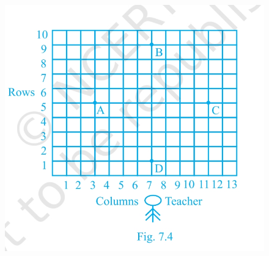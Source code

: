 \documentclass[12pt]{article}
\begin{document}
\begin{enumerate}
\begin{figure}[h!]
  \centering
  \includegraphics[width=\columnwidth]{figs/sc.jpg}
  \caption{}
\label{fig:10/7/12Fig1}
\end{figure}
\end{enumerate} 
\end{document}
